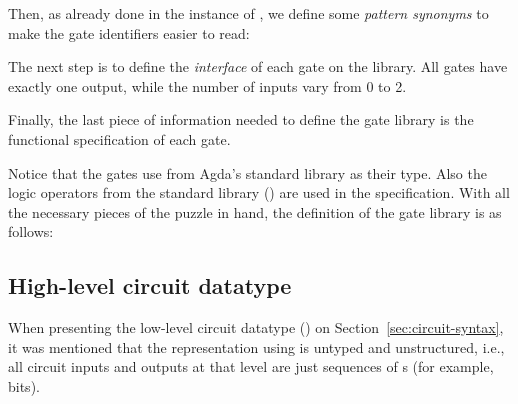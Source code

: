             \begin{center}
            \end{center}

            Then, as already done in the instance of , we define some \emph{pattern synonyms}
            to make the gate identifiers easier to read:

            \begin{center}
            \end{center}

            The next step is to define the \emph{interface} of each gate on the library.
            All gates have exactly one output, while the number of inputs vary from 0 to 2.

            \begin{center}
            \end{center}

            Finally, the last piece of information needed to define the gate library is
            the functional specification of each gate.

            \begin{center}
            \end{center}

            Notice that the gates use  from Agda's standard library as their  type.
            Also the logic operators from the standard library () are used in the specification.
            With all the necessary pieces of the puzzle in hand, the definition of the 
            gate library is as follows:

            \begin{center}
            \end{center}


        \subsection{High-level circuit datatype}
        \label{subsec:high-level-circuit}
            When presenting the low-level circuit datatype () on Section~\ref{sec:circuit-syntax},
            it was mentioned that the representation using  is untyped and unstructured, i.e.,
            all circuit inputs and outputs at that level are just sequences of s (for example, bits).

